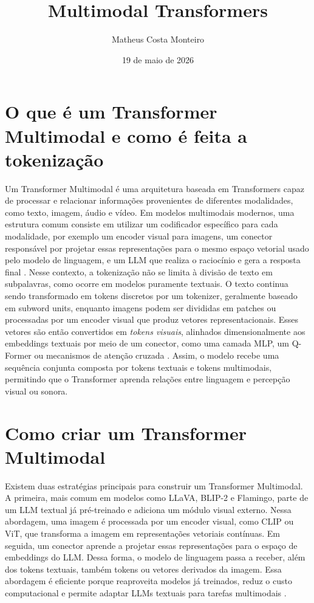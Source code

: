 \documentclass[a4paper,12pt]{article}
\begin{document}
\title{Multimodal Transformers}
\author{Matheus Costa Monteiro}
\date{19 de maio de 2026}

\section*{\textbf{O que é um Transformer Multimodal e como é feita a tokenização}}

Um Transformer Multimodal é uma arquitetura baseada em Transformers capaz de processar e relacionar informações provenientes de diferentes modalidades, como texto, imagem, áudio e vídeo. Em modelos multimodais modernos, uma estrutura comum consiste em utilizar um codificador específico para cada modalidade, por exemplo um encoder visual para imagens, um conector responsável por projetar essas representações para o mesmo espaço vetorial usado pelo modelo de linguagem, e um LLM que realiza o raciocínio e gera a resposta final \cite{yin2024survey}. Nesse contexto, a tokenização não se limita à divisão de texto em subpalavras, como ocorre em modelos puramente textuais. O texto continua sendo transformado em tokens discretos por um tokenizer, geralmente baseado em subword units, enquanto imagens podem ser divididas em patches ou processadas por um encoder visual que produz vetores representacionais. Esses vetores são então convertidos em \textit{tokens visuais}, alinhados dimensionalmente aos embeddings textuais por meio de um conector, como uma camada MLP, um Q-Former ou mecanismos de atenção cruzada \cite{yin2024survey}. Assim, o modelo recebe uma sequência conjunta composta por tokens textuais e tokens multimodais, permitindo que o Transformer aprenda relações entre linguagem e percepção visual ou sonora.

\section*{\textbf{Como criar um Transformer Multimodal}}

Existem duas estratégias principais para construir um Transformer Multimodal. A primeira, mais comum em modelos como LLaVA, BLIP-2 e Flamingo, parte de um LLM textual já pré-treinado e adiciona um módulo visual externo. Nessa abordagem, uma imagem é processada por um encoder visual, como CLIP ou ViT, que transforma a imagem em representações vetoriais contínuas. Em seguida, um conector aprende a projetar essas representações para o espaço de embeddings do LLM. Dessa forma, o modelo de linguagem passa a receber, além dos tokens textuais, também tokens ou vetores derivados da imagem. Essa abordagem é eficiente porque reaproveita modelos já treinados, reduz o custo computacional e permite adaptar LLMs textuais para tarefas multimodais \cite{yin2024survey}.
\end{document}
